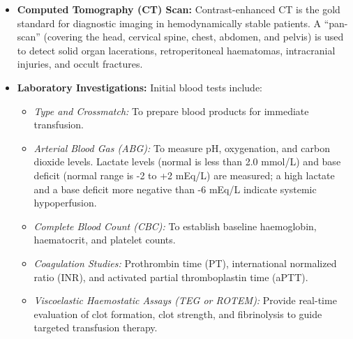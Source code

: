\begin{itemize}
    \item \textbf{Computed Tomography (CT) Scan:} Contrast-enhanced CT is the gold standard for diagnostic imaging in hemodynamically stable patients. A ``pan-scan'' (covering the head, cervical spine, chest, abdomen, and pelvis) is used to detect solid organ lacerations, retroperitoneal haematomas, intracranial injuries, and occult fractures.
    \item \textbf{Laboratory Investigations:} Initial blood tests include:
    \begin{itemize}
        \item \textit{Type and Crossmatch:} To prepare blood products for immediate transfusion.
        \item \textit{Arterial Blood Gas (ABG):} To measure pH, oxygenation, and carbon dioxide levels. Lactate levels (normal is less than 2.0 mmol/L) and base deficit (normal range is -2 to +2 mEq/L) are measured; a high lactate and a base deficit more negative than -6 mEq/L indicate systemic hypoperfusion.
        \item \textit{Complete Blood Count (CBC):} To establish baseline haemoglobin, haematocrit, and platelet counts.
        \item \textit{Coagulation Studies:} Prothrombin time (PT), international normalized ratio (INR), and activated partial thromboplastin time (aPTT).
        \item \textit{Viscoelastic Haemostatic Assays (TEG or ROTEM):} Provide real-time evaluation of clot formation, clot strength, and fibrinolysis to guide targeted transfusion therapy.
    \end{itemize}
\end{itemize}

